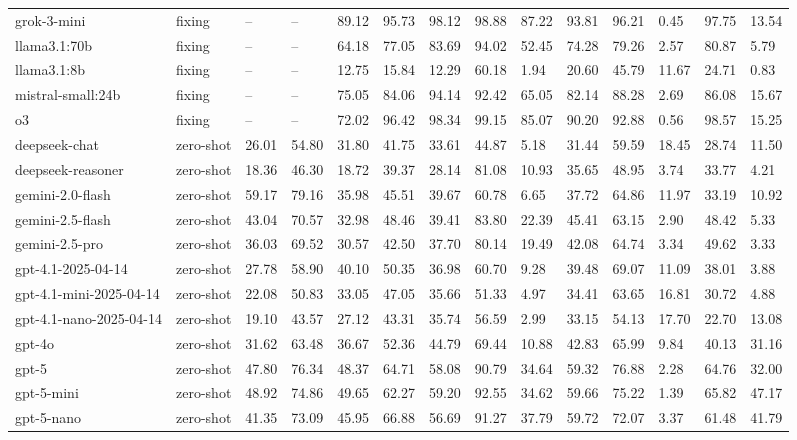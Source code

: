 \begin{table}[!t]
\begin{tabular}{llllllllllllll}
grok-3-mini & fixing & -- & -- & 89.12 & 95.73 & 98.12 & 98.88 & 87.22 & 93.81 & 96.21 & 0.45 & 97.75 & 13.54 \\
llama3.1:70b & fixing & -- & -- & 64.18 & 77.05 & 83.69 & 94.02 & 52.45 & 74.28 & 79.26 & 2.57 & 80.87 & 5.79 \\
llama3.1:8b & fixing & -- & -- & 12.75 & 15.84 & 12.29 & 60.18 & 1.94 & 20.60 & 45.79 & 11.67 & 24.71 & 0.83 \\
mistral-small:24b & fixing & -- & -- & 75.05 & 84.06 & 94.14 & 92.42 & 65.05 & 82.14 & 88.28 & 2.69 & 86.08 & 15.67 \\
o3 & fixing & -- & -- & 72.02 & 96.42 & 98.34 & 99.15 & 85.07 & 90.20 & 92.88 & 0.56 & 98.57 & 15.25 \\
deepseek-chat & zero-shot & 26.01 & 54.80 & 31.80 & 41.75 & 33.61 & 44.87 & 5.18 & 31.44 & 59.59 & 18.45 & 28.74 & 11.50 \\
deepseek-reasoner & zero-shot & 18.36 & 46.30 & 18.72 & 39.37 & 28.14 & 81.08 & 10.93 & 35.65 & 48.95 & 3.74 & 33.77 & 4.21 \\
gemini-2.0-flash & zero-shot & 59.17 & 79.16 & 35.98 & 45.51 & 39.67 & 60.78 & 6.65 & 37.72 & 64.86 & 11.97 & 33.19 & 10.92 \\
gemini-2.5-flash & zero-shot & 43.04 & 70.57 & 32.98 & 48.46 & 39.41 & 83.80 & 22.39 & 45.41 & 63.15 & 2.90 & 48.42 & 5.33 \\
gemini-2.5-pro & zero-shot & 36.03 & 69.52 & 30.57 & 42.50 & 37.70 & 80.14 & 19.49 & 42.08 & 64.74 & 3.34 & 49.62 & 3.33 \\
gpt-4.1-2025-04-14 & zero-shot & 27.78 & 58.90 & 40.10 & 50.35 & 36.98 & 60.70 & 9.28 & 39.48 & 69.07 & 11.09 & 38.01 & 3.88 \\
gpt-4.1-mini-2025-04-14 & zero-shot & 22.08 & 50.83 & 33.05 & 47.05 & 35.66 & 51.33 & 4.97 & 34.41 & 63.65 & 16.81 & 30.72 & 4.88 \\
gpt-4.1-nano-2025-04-14 & zero-shot & 19.10 & 43.57 & 27.12 & 43.31 & 35.74 & 56.59 & 2.99 & 33.15 & 54.13 & 17.70 & 22.70 & 13.08 \\
gpt-4o & zero-shot & 31.62 & 63.48 & 36.67 & 52.36 & 44.79 & 69.44 & 10.88 & 42.83 & 65.99 & 9.84 & 40.13 & 31.16 \\
gpt-5 & zero-shot & 47.80 & 76.34 & 48.37 & 64.71 & 58.08 & 90.79 & 34.64 & 59.32 & 76.88 & 2.28 & 64.76 & 32.00 \\
gpt-5-mini & zero-shot & 48.92 & 74.86 & 49.65 & 62.27 & 59.20 & 92.55 & 34.62 & 59.66 & 75.22 & 1.39 & 65.82 & 47.17 \\
gpt-5-nano & zero-shot & 41.35 & 73.09 & 45.95 & 66.88 & 56.69 & 91.27 & 37.79 & 59.72 & 72.07 & 3.37 & 61.48 & 41.79 \\

\end{tabular}
\end{table}

